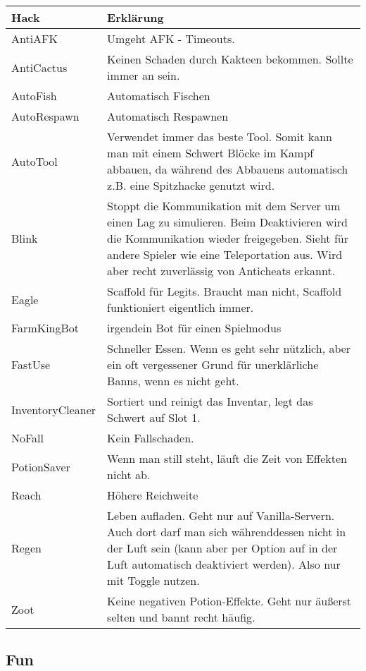 \begin{longtable}{p{3cm}|p{10cm}}
\textbf{Hack} & \textbf{Erklärung} \\
\hline
AntiAFK & Umgeht AFK - Timeouts. \\
\hline
\rowcolor{lime!50} AntiCactus & Keinen Schaden durch Kakteen bekommen. Sollte immer an sein. \\
\hline
AutoFish & Automatisch Fischen \\
\hline
\rowcolor{lime!50} AutoRespawn & Automatisch Respawnen \\
\hline
\rowcolor{lime!50} AutoTool & Verwendet immer das beste Tool. Somit kann man mit einem Schwert Blöcke im Kampf abbauen, da während des Abbauens automatisch z.B. eine Spitzhacke genutzt wird. \\
\hline
Blink & Stoppt die Kommunikation mit dem Server um einen Lag zu simulieren. Beim Deaktivieren wird die Kommunikation wieder freigegeben. Sieht für andere Spieler wie eine Teleportation aus. Wird aber recht zuverlässig von Anticheats erkannt. \\
\hline
Eagle & Scaffold für Legits. Braucht man nicht, Scaffold funktioniert eigentlich immer. \\
\hline
FarmKingBot & irgendein Bot für einen Spielmodus \\
\hline
\rowcolor{lime!50} FastUse & Schneller Essen. Wenn es geht sehr nützlich, aber ein oft vergessener Grund für unerklärliche Banns, wenn es nicht geht. \\
\hline
\rowcolor{lime!50} InventoryCleaner & Sortiert und reinigt das Inventar, legt das Schwert auf Slot 1. \\
\hline
\rowcolor{lime!50} NoFall & Kein Fallschaden. \\
\hline
PotionSaver & Wenn man still steht, läuft die Zeit von Effekten nicht ab. \\
\hline
Reach & Höhere Reichweite \\
\hline
Regen & Leben aufladen. Geht nur auf Vanilla-Servern. Auch dort darf man sich währenddessen nicht in der Luft sein (kann aber per Option auf in der Luft automatisch deaktiviert werden). Also nur mit Toggle nutzen. \\
\hline
Zoot & Keine negativen Potion-Effekte. Geht nur äußerst selten und bannt recht häufig. \\
\end{longtable}

\subsection{Fun}

